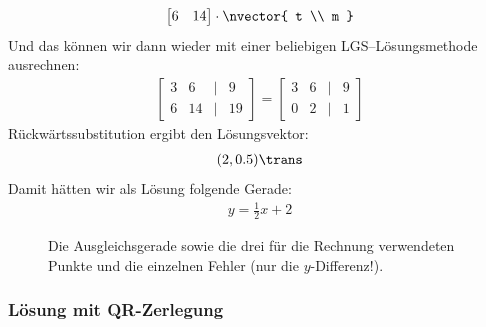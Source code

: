 {\begin{align*}
\begin{bmatrix}
				6 & 14
			\end{bmatrix} \cdot 
			\nvector{
				t \\ m
			}
		\end{align*}
		Und das können wir dann wieder mit einer beliebigen LGS--Lösungsmethode ausrechnen:
		\begin{align*}
			\begin{bmatrix}
				3 & 6 & | & 9\\
				6 & 14 & | & 19
			\end{bmatrix} = 
			\begin{bmatrix}
				3 & 6 & | & 9\\
				0 & 2 & | & 1
			\end{bmatrix}
		\end{align*}
		Rückwärtssubstitution ergibt den Lösungsvektor: 
		\begin{align*}
			(2, 0.5)\trans
		\end{align*}
		\n 
		Damit hätten wir als Lösung folgende Gerade: 
		\begin{align*} 
			y = \frac{1}{2} x + 2 
		\end{align*}
		\begin{figure}[H]
			\centering
			\caption{Die Ausgleichsgerade sowie die drei für die Rechnung verwendeten Punkte und die einzelnen Fehler (nur die $y$-Differenz!).}
		\end{figure}
	}
	
	\sbreak
	
	\newpage
	\subsubsection{Lösung mit QR-Zerlegung}
	
